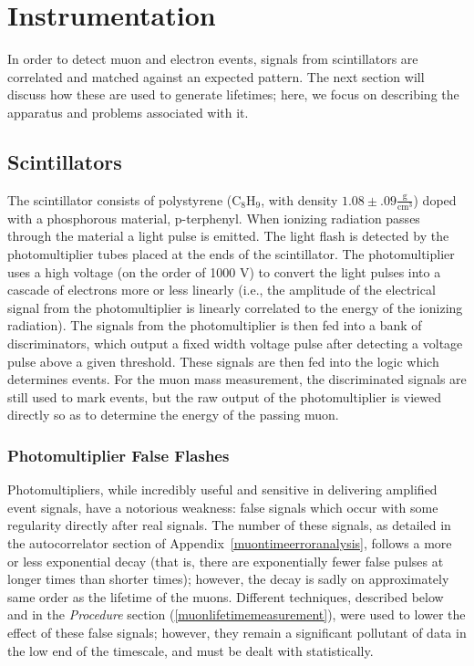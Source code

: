 \section{Instrumentation}
\label{instrumentation}

In order to detect muon and electron events, signals from scintillators are correlated and matched against an expected pattern. The next section will discuss how these are used to generate lifetimes; here, we focus on describing the apparatus and problems associated with it.

\subsection{Scintillators}
\label{scintillators}

The scintillator consists of polystyrene ($\mathrm{C}_{8}\mathrm{H}_{9}$, with density $1.08 \pm .09 \frac{\mathrm{g}}{\mathrm{cm}^{3}}$) doped with a phosphorous material, p-terphenyl. When ionizing radiation passes through the material a light pulse is emitted. The light flash is detected by the photomultiplier tubes placed at the ends of the scintillator. The photomultiplier uses a high voltage (on the order of 1000 V) to convert the light pulses into a cascade of electrons more or less linearly (i.e., the amplitude of the electrical signal from the photomultiplier is linearly correlated to the energy of the ionizing radiation). The signals from the photomultiplier is then fed into a bank of discriminators, which output a fixed width voltage pulse after detecting a voltage pulse above a given threshold. These signals are then fed into the logic which determines events. For the muon mass measurement, the discriminated signals are still used to mark events, but the raw output of the photomultiplier is viewed directly so as to determine the energy of the passing muon.

\subsubsection{Photomultiplier False Flashes}
\label{photomultiplierfalseflashes}

Photomultipliers, while incredibly useful and sensitive in delivering amplified event signals, have a notorious weakness: false signals which occur with some regularity directly after real signals. The number of these signals, as detailed in the autocorrelator section of Appendix~\ref{muontimeerroranalysis}, follows a more or less exponential decay (that is, there are exponentially fewer false pulses at longer times than shorter times); however, the decay is sadly on approximately same order as the lifetime of the muons. Different techniques, described below and in the \emph{Procedure} section (\ref{muonlifetimemeasurement}), were used to lower the effect of these false signals; however, they remain a significant pollutant of data in the low end of the timescale, and must be dealt with statistically.

